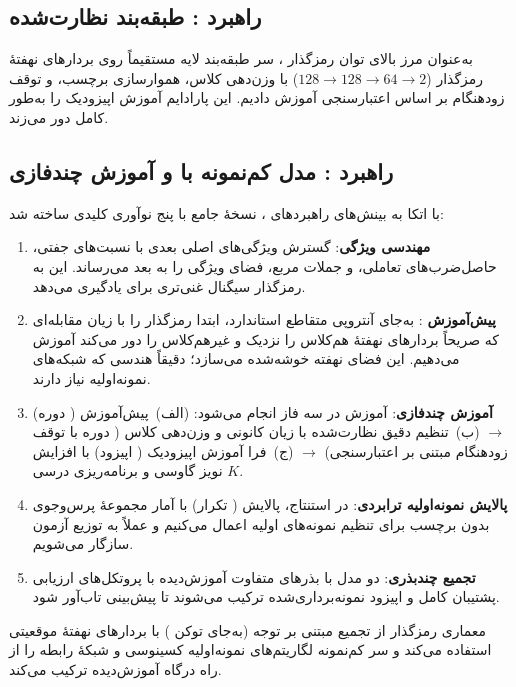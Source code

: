 \subsection{راهبرد : طبقه‌بند نظارت‌شده }

به‌عنوان مرز بالای توان رمزگذار ، سر طبقه‌بند لایه مستقیماً روی بردارهای نهفتۀ رمزگذار ($128{\to}128{\to}64{\to}2$) با وزن‌دهی کلاس، هموارسازی برچسب، و توقف زودهنگام بر اساس  اعتبارسنجی آموزش دادیم. این پارادایم آموزش اپیزودیک را به‌طور کامل دور می‌زند.

\subsection{راهبرد : مدل کم‌نمونه  با  و آموزش چندفازی}

با اتکا به بینش‌های راهبردهای ، نسخۀ جامع  با پنج نوآوری کلیدی ساخته شد:

\begin{enumerate}
\item \textbf{مهندسی ویژگی}: گسترش ویژگی‌های اصلی بعدی با نسبت‌های جفتی، حاصل‌ضرب‌های تعاملی، و جملات مربع، فضای ویژگی را به  بعد می‌رساند. این به رمزگذار سیگنال غنی‌تری برای یادگیری می‌دهد.
\item \textbf{پیش‌آموزش }: به‌جای آنتروپی متقاطع استاندارد، ابتدا رمزگذار را با زیان مقابله‌ای که صریحاً بردارهای نهفتۀ هم‌کلاس را نزدیک و غیرهم‌کلاس را دور می‌کند آموزش می‌دهیم. این فضای نهفته خوشه‌شده می‌سازد؛ دقیقاً هندسی که شبکه‌های نمونه‌اولیه نیاز دارند.
\item \textbf{آموزش چندفازی}: آموزش در سه فاز انجام می‌شود: (الف)~پیش‌آموزش  ( دوره) $\to$ (ب)~تنظیم دقیق نظارت‌شده با زیان کانونی و وزن‌دهی کلاس ( دوره با توقف زودهنگام مبتنی بر اعتبارسنجی) $\to$ (ج)~فرا آموزش اپیزودیک ( اپیزود) با افزایش نویز گاوسی و برنامه‌ریزی درسی $K$.
\item \textbf{پالایش نمونه‌اولیه ترابردی}: در استنتاج، پالایش  ( تکرار) با آمار مجموعۀ پرس‌وجوی بدون برچسب برای تنظیم نمونه‌های اولیه اعمال می‌کنیم و عملاً به توزیع آزمون سازگار می‌شویم.
\item \textbf{تجمیع چندبذری}: دو مدل با بذرهای متفاوت آموزش‌دیده با پروتکل‌های ارزیابی پشتیبان کامل و اپیزود نمونه‌برداری‌شده ترکیب می‌شوند تا پیش‌بینی تاب‌آور شود.
\end{enumerate}

معماری رمزگذار از تجمیع مبتنی بر توجه (به‌جای توکن ) با بردارهای نهفتۀ موقعیتی استفاده می‌کند و سر کم‌نمونه لگاریتم‌های نمونه‌اولیه کسینوسی و شبکۀ رابطه را از راه درگاه آموزش‌دیده ترکیب می‌کند.

